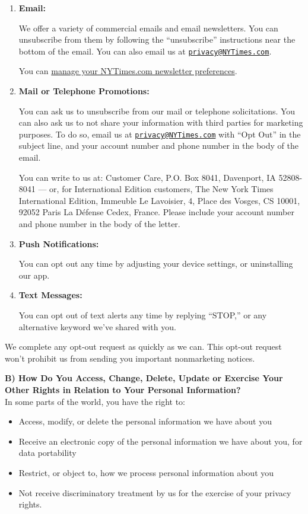 \begin{enumerate}
\def\labelenumi{\arabic{enumi}.}
\item
  \textbf{Email:}

  We offer a variety of commercial emails and email newsletters. You can
  unsubscribe from them by following the ``unsubscribe'' instructions
  near the bottom of the email. You can also email us at
  \href{mailto:privacy@NYTimes.com}{\nolinkurl{privacy@NYTimes.com}}.

  You can
  \href{https://myaccount.nytimes3xbfgragh.onion/seg/settings}{manage
  your NYTimes.com newsletter preferences}.
\item
  \textbf{Mail or Telephone Promotions:}

  You can ask us to unsubscribe from our mail or telephone
  solicitations. You can also ask us to not share your information with
  third parties for marketing purposes. To do so, email us at
  \href{mailto:privacy@NYTimes.com}{\nolinkurl{privacy@NYTimes.com}}
  with ``Opt Out'' in the subject line, and your account number and
  phone number in the body of the email.

  You can write to us at: Customer Care, P.O. Box 8041, Davenport, IA
  52808-8041 --- or, for International Edition customers, The New York
  Times International Edition, Immeuble Le Lavoisier, 4, Place des
  Vosges, CS 10001, 92052 Paris La Défense Cedex, France. Please include
  your account number and phone number in the body of the letter.
\item
  \textbf{Push Notifications:}

  You can opt out any time by adjusting your device settings, or
  uninstalling our app.
\item
  \textbf{Text Messages:}

  You can opt out of text alerts any time by replying ``STOP,'' or any
  alternative keyword we've shared with you.
\end{enumerate}

We complete any opt-out request as quickly as we can. This opt-out
request won't prohibit us from sending you important nonmarketing
notices.

\textbf{B) How Do You Access, Change, Delete, Update or Exercise Your
Other Rights in Relation to Your Personal Information?}\\
In some parts of the world, you have the right to:

\begin{itemize}
\tightlist
\item
  Access, modify, or delete the personal information we have about you
\item
  Receive an electronic copy of the personal information we have about
  you, for data portability
\item
  Restrict, or object to, how we process personal information about you
\item
  Not receive discriminatory treatment by us for the exercise of your
  privacy rights.
\end{itemize}

